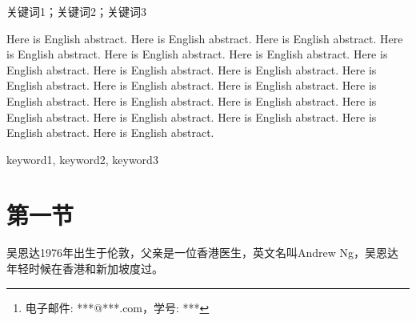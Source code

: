 \documentclass[a4paper, 12pt, centering]{article}
\begin{document}
\title{}
\author{\footnote{电子邮件: ***@***.com，学号: ***}\\[2ex]
\sanhao 浙江大学XXX学院\\[2ex]
}
\date{\sanhao\today}
\maketitle



\begin{abstract}
这里是摘要这里是摘要这里是摘要这里是摘要这里是摘要这里是摘要这里是摘要这里是摘要这里是摘要这里是摘要这里是摘要这里是摘要这里是摘要这里是摘要这里是摘要这里是摘要这里是摘要这里是摘要这里是摘要这里是摘要这里是摘要这里是摘要这里是摘要这里是摘要这里是摘要这里是摘要这里是摘要这里是摘要这里是摘要这里是摘要这里是摘要这里是摘要这里是摘要这里是摘要这里是摘要这里是摘要这里是摘要这里是摘要这里是摘要这里是摘要这里是摘要这里是摘要这里是摘要这里是摘要
\end{abstract}

\begin{keys}
关键词1；关键词2；关键词3
\end{keys}

\begin{enabstract}
Here is English abstract. Here is English abstract. Here is English abstract. Here is English abstract. Here is English abstract. Here is English abstract. Here is English abstract. Here is English abstract. Here is English abstract. Here is English abstract. Here is English abstract. Here is English abstract. Here is English abstract. Here is English abstract. Here is English abstract. Here is English abstract. Here is English abstract. Here is English abstract. Here is English abstract. Here is English abstract.
\end{enabstract}

\begin{enkeys}
keyword1, keyword2, keyword3
\end{enkeys}
\newpage

\tableofcontents
\newpage

\section{第一节}
吴恩达1976年出生于伦敦，父亲是一位香港医生，英文名叫Andrew Ng，吴恩达年轻时候在香港和新加坡度过。
\end{document}
